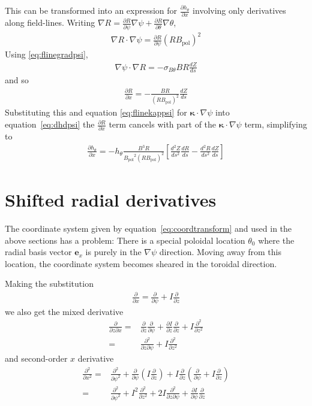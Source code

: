 \documentclass[12pt]{article}
\newcommand{\sbt}{\ensuremath{\sigma_{B\theta}}}
\newcommand{\deriv}[2]{\ensuremath{\frac{\partial #1}{\partial #2}}}
\newcommand{\hthe}{\ensuremath{h_\theta}}
\newcommand{\Bp}{\ensuremath{B_{\text{pol}}}}
\newcommand{\ve}[1]{\ensuremath{\boldsymbol{#1}}}
\newcommand{\kvec}{\ve{\kappa}}
\newcommand{\rbp}{\ensuremath{R\Bp}}
\newcommand{\rbpsq}{\ensuremath{\left(\rbp\right)^2}}
\begin{document}
%
This can be transformed into an expression for $\deriv{\hthe}{x}$ involving
only derivatives along field-lines.  Writing $\nabla R =
\deriv{R}{\psi}\nabla\psi + \deriv{R}{\theta}\nabla\theta$,
%
\begin{align*}
\nabla R \cdot \nabla\psi = \deriv{R}{\psi}\rbpsq
\end{align*}
%
Using \ref{eq:flinegradpsi},
%
\begin{align*}
\nabla\psi \cdot \nabla R = -\sbt B R\frac{dZ}{ds}
\end{align*}
%
and so
%
\begin{align*}
\deriv{R}{x} = -\frac{BR}{\rbpsq}\frac{dZ}{ds}
\end{align*}
%
Substituting this and equation \ref{eq:flinekappsi} for $\kvec\cdot\nabla\psi$
into equation~\ref{eq:dhdpsi} the $\deriv{R}{x}$ term cancels with part of the
$\kvec\cdot\nabla\psi$ term, simplifying to
%
\begin{align*}
\deriv{\hthe}{x} =
-\hthe\frac{B^3R}{\Bp^2\rbpsq}\left[\frac{d^2Z}{ds^2}\frac{dR}{ds} -
\frac{d^2R}{ds^2}\frac{dZ}{ds}\right]
\end{align*}
%





\section{Shifted radial derivatives}
%
\label{sec:shiftcoords}
The coordinate system given by equation~\ref{eq:coordtransform} and used in the
above sections has a problem: There is a special poloidal location $\theta_0$
where the radial basis vector $\ve{e}_x$ is purely in the $\nabla\psi$
direction.  Moving away from this location, the coordinate system becomes
sheared in the toroidal direction.

Making the substitution
%
\begin{align*}
\deriv{}{x} = \deriv{}{\psi} + I\deriv{}{z}
\end{align*}
%
we also get the mixed derivative
%
\begin{align*}
\frac{\partial}{\partial z\partial x} =& \deriv{}{z}\deriv{}{\psi} +
    \deriv{I}{z}\deriv{}{z} + I\frac{\partial^2}{\partial z^2} \nonumber \\ =&
    \frac{\partial^2}{\partial z\partial \psi} + I\frac{\partial^2}{\partial
    z^2}
\end{align*}
%
and second-order $x$ derivative
%
\begin{align*}
\frac{\partial^2}{\partial x^2} =& \frac{\partial^2}{\partial \psi^2} +
    \deriv{}{\psi}\left(I\deriv{}{z}\right) + I\deriv{}{z}\left(\deriv{}{\psi}
    + I\deriv{}{z}\right) \nonumber \\ =& \frac{\partial^2}{\partial \psi^2} +
        I^2\frac{\partial^2}{\partial z^2} + 2I\frac{\partial^2}{\partial
        z\partial \psi} + \deriv{I}{\psi}\deriv{}{z}
\end{align*}
%
\end{document}
